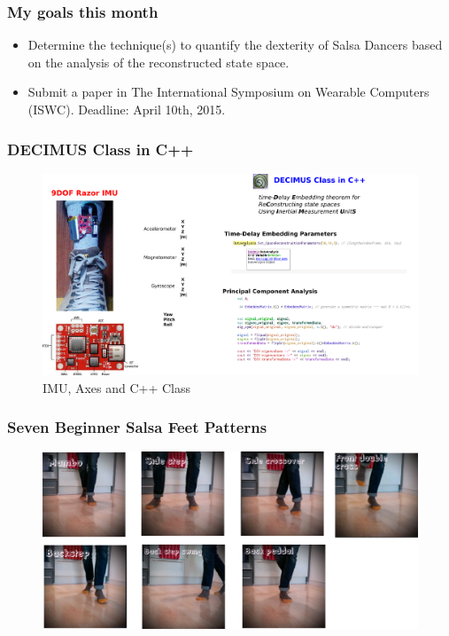 \documentclass{beamer}
\begin{document}
\begin{frame}
\frametitle{My goals this month}


   \begin{itemize}	
      \item Determine the technique(s) to quantify the dexterity of 
        Salsa Dancers based on the analysis of the reconstructed state space.
      \item Submit a paper in The International Symposium on Wearable Computers (ISWC).
        Deadline: April 10th, 2015.
    \end{itemize}


\end{frame}


\begin{frame}
\frametitle{DECIMUS Class in C++}

\begin{figure}
\includegraphics[scale=0.2]{procedure} \\
IMU, Axes and C++ Class
\end{figure}  
\end{frame}


\begin{frame}
\frametitle{Seven Beginner Salsa Feet Patterns}

\begin{figure}
\includegraphics[scale=0.5]{beginner_salsa_steps_00} \\

\end{figure}  
\end{frame}
\end{document}
